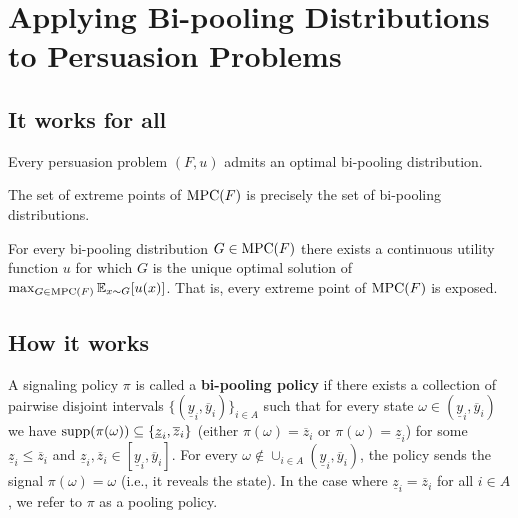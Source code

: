\documentclass[11pt]{elegantbook}
\begin{document}
\section{Applying Bi-pooling Distributions to Persuasion Problems}
\subsection{It works for all}
\begin{theorem}
    Every persuasion problem $(F,u)$ admits an optimal bi-pooling distribution.
\end{theorem}

\begin{proposition}
    The set of extreme points of $\textnormal{MPC}(F)$ is precisely the set of bi-pooling distributions.
\end{proposition}

\begin{theorem}
    For every bi-pooling distribution $G \in \textnormal{MPC}(F)$ there exists a continuous utility function $u$ for which $G$ is the unique optimal solution of $\max_{G\in \textnormal{MPC}(F)}\mathbb{E}_{x\sim G}[u(x)]$. That is, every extreme point of $\textnormal{MPC}(F)$ is exposed.
\end{theorem}


\subsection{How it works}
\begin{definition}
    \normalfont
    A signaling policy $\pi$ is called a \textbf{bi-pooling policy} if there exists a collection of pairwise disjoint intervals $\{(\underline{y}_i,\overline{y}_i)\}_{i\in A}$ such that for every state $\omega\in (\underline{y}_i,\overline{y}_i)$ we have $\textnormal{supp}(\pi(\omega))\subseteq\{\underline{z}_i,\overline{z}_i\}$ (either $\pi(\omega)=\overline{z}_i$ or $\pi(\omega)=\underline{z}_i$) for some $\underline{z}_i\leq\overline{z}_i$ and $\underline{z}_i,\overline{z}_i\in [\underline{y}_i,\overline{y}_i]$. For every $\omega\notin \cup_{i\in A}(\underline{y}_i,\overline{y}_i)$, the policy sends the signal $\pi(\omega) = \omega$ (i.e., it reveals the state). In the case where $\underline{z}_i=\overline{z}_i$ for all $i\in A$, we refer to $\pi$ as a pooling policy.
\end{definition}
\end{document}
